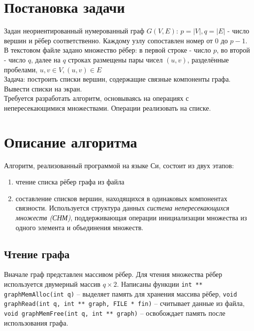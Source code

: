 \documentclass[zuev-report.tex]{subfiles}
\begin{document}
	
\section{Постановка задачи}
Задан неориентированный нумерованный граф $G(V, E)$: $p = |V|, q = |E|$ - число вершин и рёбер соответственно. Каждому узлу сопоставлен номер от $0$ до $p - 1$. В текстовом файле задано множество рёбер: в первой строке - число $p$, во второй - число $q$, далее на $q$ строках размещены пары чисел $(u, v)$, разделённые пробелами, $u, v \in V, (u, v) \in E$\\
Задача: построить списки вершин, содержащие связные компоненты графа. Вывести списки на экран.\\
Требуется разработать алгоритм, основываясь на операциях с непересекающимися множествами. Операции реализовать на списке.\\

\newpage
\section{Описание алгоритма}
Алгоритм, реализованный программой на языке Си, состоит из двух этапов:
\begin{enumerate}
	\item чтение списка рёбер графа из файла
	\item составление списков вершин, находящихся в одинаковых компонентах связности. Используется структура данных \textit{система непересекающихся множеств (СНМ)}, поддерживающая операции инициализации множества из одного элемента и объединения множеств.
\end{enumerate}
\subsection{Чтение графа}
Вначале граф представлен массивом рёбер. Для чтения множества рёбер используется двумерный массив $q\times 2$. Написаны функции \lstinline|int ** graphMemAlloc(int q)|  -- выделяет память для хранения массива рёбер, \lstinline|void graphRead(int q, int ** graph, FILE * fin)| -- считывает данные из файла,  \lstinline|void graphMemFree(int q, int ** graph)| -- освобождает память после использования графа.
\end{document}
